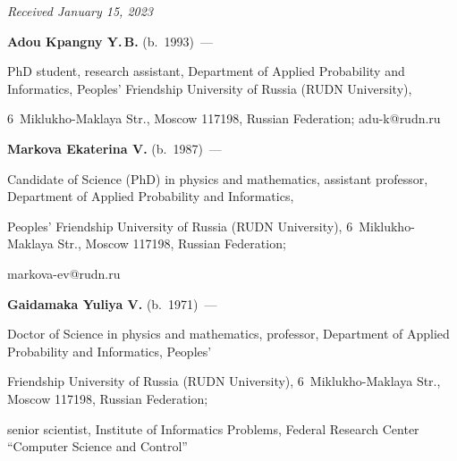 \hfill{\small\textit{Received January 15, 2023}}





\vspace*{-14pt}





\Contr





\vspace*{-3pt}





\noindent


\textbf{Adou Kpangny Y.\,B.} (b.\ 1993)~--- 


PhD student, research assistant, Department of Applied Probability and Informatics, Peoples' Friendship University of Russia (RUDN University), 


6~Miklukho-Maklaya Str., Moscow 117198, Russian Federation; \mbox{adu-k@rudn.ru}





\pagebreak





\noindent


\textbf{Markova Ekaterina V.} (b.\ 1987)~--- 


Candidate of Science (PhD) in physics and mathematics, assistant professor, Department of Applied Probability and Informatics, 


Peoples' Friendship University of Russia (RUDN University), 6~Miklukho-Maklaya Str., Moscow 117198, Russian Federation; 


\mbox{markova-ev@rudn.ru}





\vspace*{6pt}





\noindent


\textbf{Gaidamaka Yuliya V.} (b.\ 1971)~--- 


Doctor of Science in physics and mathematics, professor, Department of Applied Probability and Informatics, Peoples' 


Friendship University of Russia (RUDN University), 6~Miklukho-Maklaya Str., Moscow 117198, Russian Federation; 


senior scientist, Institute of Informatics Problems, Federal Research Center ``Computer Science and Control'' 


